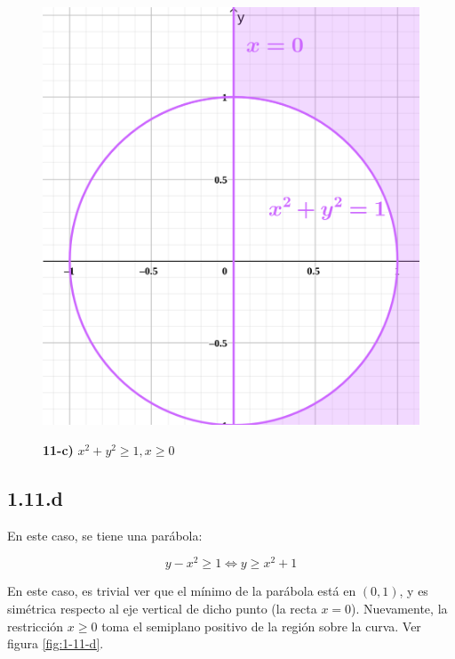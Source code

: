 \documentclass{article}
\begin{document}
\begin{figure}[ht]
\caption{\textbf{11-c)} $x^2 + y^2 \geq 1, x \geq 0$}
\includegraphics[scale=1.85]{../img/exercises/guide_01/11_c.png} 
\centering
\label{fig:1-11-c}
\end{figure}

\subsection*{1.11.d}
\label{subsec:1.11.d}

En este caso, se tiene una parábola:

\begin{equation}
y - x^2 \geq 1 \Leftrightarrow y \geq x^2 + 1
\end{equation}

En este caso, es trivial ver que el mínimo de la parábola está en $(0, 1)$, y es simétrica respecto al eje vertical de dicho punto (la recta $x = 0$). Nuevamente, la restricción $x \geq 0$ toma el semiplano positivo de la región sobre la curva. Ver figura \ref{fig:1-11-d}.
\end{document}

